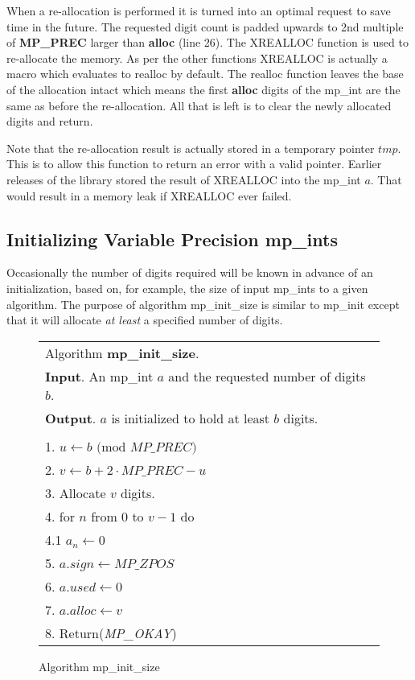 \documentclass[b5paper]{book}
\begin{document}
When a re-allocation is performed it is turned into an optimal request to save time in the future.  The requested digit count is
padded upwards to 2nd multiple of \textbf{MP\_PREC} larger than \textbf{alloc} (line 26).  The XREALLOC function is used
to re-allocate the memory.  As per the other functions XREALLOC is actually a macro which evaluates to realloc by default.  The realloc
function leaves the base of the allocation intact which means the first \textbf{alloc} digits of the mp\_int are the same as before
the re-allocation.  All	that is left is to clear the newly allocated digits and return.

Note that the re-allocation result is actually stored in a temporary pointer $tmp$.  This is to allow this function to return
an error with a valid pointer.  Earlier releases of the library stored the result of XREALLOC into the mp\_int $a$.  That would
result in a memory leak if XREALLOC ever failed.  

\subsection{Initializing Variable Precision mp\_ints}
Occasionally the number of digits required will be known in advance of an initialization, based on, for example, the size 
of input mp\_ints to a given algorithm.  The purpose of algorithm mp\_init\_size is similar to mp\_init except that it 
will allocate \textit{at least} a specified number of digits.  

\begin{figure}[here]
\begin{small}
\begin{center}
\begin{tabular}{l}
\hline Algorithm \textbf{mp\_init\_size}. \\
\textbf{Input}.   An mp\_int $a$ and the requested number of digits $b$. \\
\textbf{Output}.  $a$ is initialized to hold at least $b$ digits. \\
\hline \\
1.  $u \leftarrow b \mbox{ (mod }MP\_PREC\mbox{)}$ \\
2.  $v \leftarrow b + 2 \cdot MP\_PREC - u$ \\
3.  Allocate $v$ digits. \\
4.  for $n$ from $0$ to $v - 1$ do \\
\hspace{3mm}4.1  $a_n \leftarrow 0$ \\
5.  $a.sign \leftarrow MP\_ZPOS$\\
6.  $a.used \leftarrow 0$\\
7.  $a.alloc \leftarrow v$\\
8.  Return(\textit{MP\_OKAY})\\
\hline
\end{tabular}
\end{center}
\end{small}
\caption{Algorithm mp\_init\_size}
\end{figure}
\end{document}
